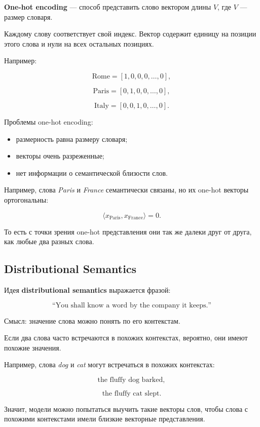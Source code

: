 \documentclass[a4paper,12pt]{article}
\begin{document}
\textbf{One-hot encoding} --- способ представить слово вектором длины \(V\), где \(V\) --- размер словаря.

Каждому слову соответствует свой индекс. Вектор содержит единицу на позиции этого слова и нули на всех остальных позициях.

Например:

\[
\text{Rome} =
[1,0,0,0,\dots,0],
\]

\[
\text{Paris} =
[0,1,0,0,\dots,0],
\]

\[
\text{Italy} =
[0,0,1,0,\dots,0].
\]

Проблемы one-hot encoding:

\begin{itemize}
    \item размерность равна размеру словаря;
    \item векторы очень разреженные;
    \item нет информации о семантической близости слов.
\end{itemize}

Например, слова \textit{Paris} и \textit{France} семантически связаны, но их one-hot векторы ортогональны:

\[
\langle x_{\text{Paris}}, x_{\text{France}} \rangle = 0.
\]

То есть с точки зрения one-hot представления они так же далеки друг от друга, как любые два разных слова.

\subsection{Distributional Semantics}

Идея \textbf{distributional semantics} выражается фразой:

\[
\text{``You shall know a word by the company it keeps.''}
\]

Смысл: значение слова можно понять по его контекстам.

Если два слова часто встречаются в похожих контекстах, вероятно, они имеют похожие значения.

Например, слова \textit{dog} и \textit{cat} могут встречаться в похожих контекстах:

\[
\text{the fluffy dog barked},
\]

\[
\text{the fluffy cat slept}.
\]

Значит, модели можно попытаться выучить такие векторы слов, чтобы слова с похожими контекстами имели близкие векторные представления.
\end{document}
